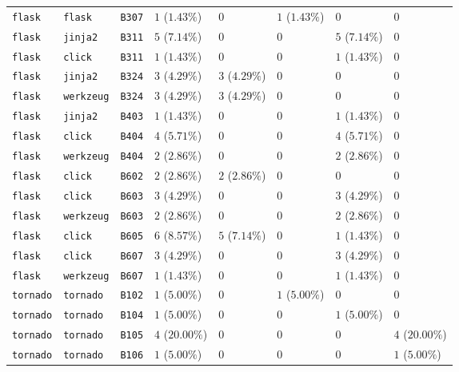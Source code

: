 \begin{table}
\begin{tabular}{llllllll}
\texttt{flask} & \texttt{flask} & \texttt{B307} & $1$ ($1.43\%$) & $0$ & $1$ ($1.43\%$) & $0$ & $0$ \\
\texttt{flask} & \texttt{jinja2} & \texttt{B311} & $5$ ($7.14\%$) & $0$ & $0$ & $5$ ($7.14\%$) & $0$ \\
\texttt{flask} & \texttt{click} & \texttt{B311} & $1$ ($1.43\%$) & $0$ & $0$ & $1$ ($1.43\%$) & $0$ \\
\texttt{flask} & \texttt{jinja2} & \texttt{B324} & $3$ ($4.29\%$) & $3$ ($4.29\%$) & $0$ & $0$ & $0$ \\
\texttt{flask} & \texttt{werkzeug} & \texttt{B324} & $3$ ($4.29\%$) & $3$ ($4.29\%$) & $0$ & $0$ & $0$ \\
\texttt{flask} & \texttt{jinja2} & \texttt{B403} & $1$ ($1.43\%$) & $0$ & $0$ & $1$ ($1.43\%$) & $0$ \\
\texttt{flask} & \texttt{click} & \texttt{B404} & $4$ ($5.71\%$) & $0$ & $0$ & $4$ ($5.71\%$) & $0$ \\
\texttt{flask} & \texttt{werkzeug} & \texttt{B404} & $2$ ($2.86\%$) & $0$ & $0$ & $2$ ($2.86\%$) & $0$ \\
\texttt{flask} & \texttt{click} & \texttt{B602} & $2$ ($2.86\%$) & $2$ ($2.86\%$) & $0$ & $0$ & $0$ \\
\texttt{flask} & \texttt{click} & \texttt{B603} & $3$ ($4.29\%$) & $0$ & $0$ & $3$ ($4.29\%$) & $0$ \\
\texttt{flask} & \texttt{werkzeug} & \texttt{B603} & $2$ ($2.86\%$) & $0$ & $0$ & $2$ ($2.86\%$) & $0$ \\
\texttt{flask} & \texttt{click} & \texttt{B605} & $6$ ($8.57\%$) & $5$ ($7.14\%$) & $0$ & $1$ ($1.43\%$) & $0$ \\
\texttt{flask} & \texttt{click} & \texttt{B607} & $3$ ($4.29\%$) & $0$ & $0$ & $3$ ($4.29\%$) & $0$ \\
\texttt{flask} & \texttt{werkzeug} & \texttt{B607} & $1$ ($1.43\%$) & $0$ & $0$ & $1$ ($1.43\%$) & $0$ \\
\texttt{tornado} & \texttt{tornado} & \texttt{B102} & $1$ ($5.00\%$) & $0$ & $1$ ($5.00\%$) & $0$ & $0$ \\
\texttt{tornado} & \texttt{tornado} & \texttt{B104} & $1$ ($5.00\%$) & $0$ & $0$ & $1$ ($5.00\%$) & $0$ \\
\texttt{tornado} & \texttt{tornado} & \texttt{B105} & $4$ ($20.00\%$) & $0$ & $0$ & $0$ & $4$ ($20.00\%$) \\
\texttt{tornado} & \texttt{tornado} & \texttt{B106} & $1$ ($5.00\%$) & $0$ & $0$ & $0$ & $1$ ($5.00\%$) \\

\end{tabular}
\end{table}

